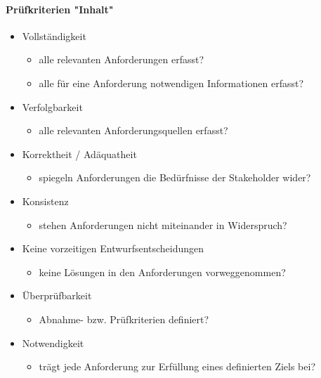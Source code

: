 \documentclass[a4paper]{article}
\begin{document}
\newpage
			
				\paragraph{Prüfkriterien "Inhalt"}
				
				\begin{itemize}
					\item Vollständigkeit
						\begin{itemize}
							\item alle relevanten Anforderungen erfasst?
							\item alle für eine Anforderung notwendigen Informationen erfasst?
						\end{itemize}
					\item Verfolgbarkeit
						\begin{itemize}
							\item alle relevanten Anforderungsquellen erfasst?
						\end{itemize}
					\item Korrektheit / Adäquatheit
						\begin{itemize}
							\item spiegeln Anforderungen die Bedürfnisse der Stakeholder wider?
						\end{itemize}
					\item Konsistenz
						\begin{itemize}
							\item stehen Anforderungen nicht miteinander in Widerspruch?
						\end{itemize}
					\item Keine vorzeitigen Entwurfsentscheidungen
						\begin{itemize}
							\item keine Lösungen in den Anforderungen vorweggenommen?
						\end{itemize}
					\item Überprüfbarkeit
						\begin{itemize}
							\item Abnahme- bzw. Prüfkriterien definiert?
						\end{itemize}
					\item Notwendigkeit
						\begin{itemize}
							\item trägt jede Anforderung zur Erfüllung eines definierten Ziels bei?
						\end{itemize}
				\end{itemize}
				
\end{document}
